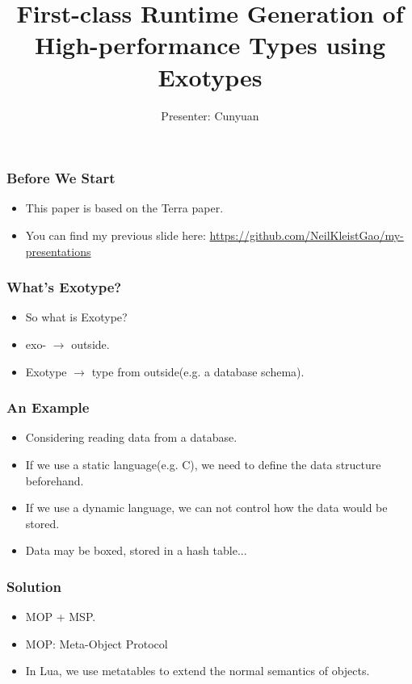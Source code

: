 \documentclass{beamer}
\begin{document}
\title{First-class Runtime Generation of High-performance Types using Exotypes}
\author{Presenter: Cunyuan}
\maketitle

\begin{frame}
	\frametitle{Before We Start}
  \begin{itemize}
  \item This paper is based on the Terra paper.\pause
  \item You can find my previous slide here: \url{https://github.com/NeilKleistGao/my-presentations}
  \end{itemize}
\end{frame}

\begin{frame}
	\frametitle{What's Exotype?}
  \begin{itemize}
  \item So what is Exotype?\pause
  \item exo- $\rightarrow$ outside.\pause
  \item Exotype $\rightarrow$ type from outside(e.g. a database schema).
  \end{itemize}
\end{frame}

\begin{frame}
	\frametitle{An Example}
  \begin{itemize}
  \item Considering reading data from a database.\pause
  \item If we use a static language(e.g. C), we need to define the data structure beforehand.\pause
  \item If we use a dynamic language, we can not control how the data would be stored.\pause
  \item Data may be boxed, stored in a hash table...
  \end{itemize}
\end{frame}

\begin{frame}
	\frametitle{Solution}
  \begin{itemize}
  \item MOP + MSP.\pause
  \item MOP: Meta-Object Protocol\pause
  \item In Lua, we use metatables to extend the normal semantics of objects.
  \end{itemize}
\end{frame}
\end{document}
